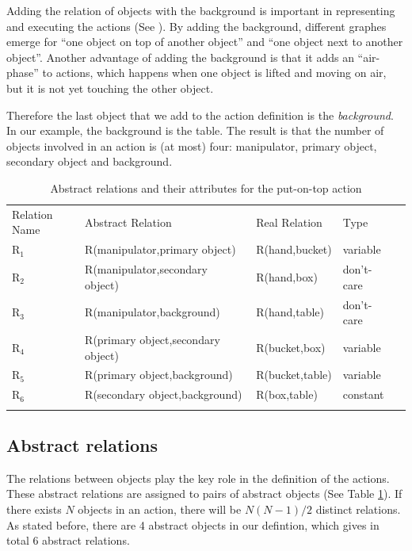 Adding the relation of objects with the background is important in representing and executing the actions (See \cite{TAMD13}).
By adding the background, different graphes emerge for ``one object on top of another object'' and ``one object next to another object''.
Another advantage of adding the background is that it adds an ``air-phase'' to actions,
which happens when one object is lifted and moving on air, but it is not yet touching the other object.

Therefore the last object that we add to the action definition is the \textit{background}.
In our example, the background is the table.
The result is that the number of objects involved in an action is (at most) four: manipulator, primary object, secondary object and background.

\begin{table}
\caption{Abstract relations and their attributes for the put-on-top action}
\begin{tabular}{ lllll }
\hline\noalign{\smallskip}
Relation Name & Abstract Relation & Real Relation & Type \\
\noalign{\smallskip}\hline\noalign{\smallskip}
$\text{R}_1$  & R(manipulator,primary object) & R(hand,bucket) & variable \\
$\text{R}_2$  & R(manipulator,secondary object)& R(hand,box) & don't-care \\
$\text{R}_3$  & R(manipulator,background) & R(hand,table) & don't-care \\
$\text{R}_4$  & R(primary object,secondary object) & R(bucket,box) & variable  \\
$\text{R}_5$  & R(primary object,background) & R(bucket,table) & variable \\
$\text{R}_6$  & R(secondary object,background)& R(box,table) & constant \\
\noalign{\smallskip}\hline
\end{tabular}
\label{tab:relations}
\end{table}

\subsection{Abstract relations}
The relations between objects play the key role in the definition of the actions.
These abstract relations are assigned to pairs of abstract objects (See Table \ref{tab:relations}).
If there exists $N$ objects in an action,
there will be $N(N-1)/2$ distinct relations.
As stated before, there are 4 abstract objects in our defintion, which gives in total 6 abstract relations.


